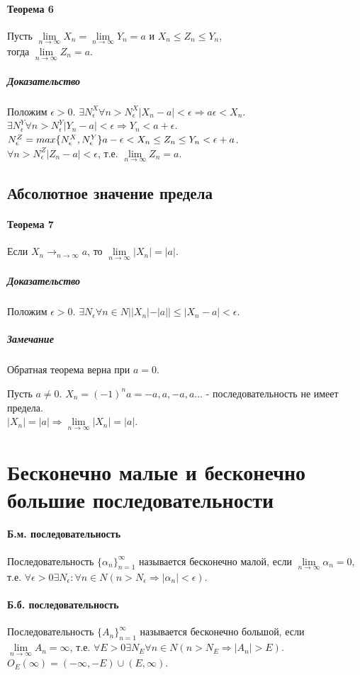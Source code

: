 \documentclass[10pt]{article}
\newcommand{\limninf}{\lim\limits_{n \to \infty}}
\newcommand{\seq}[2]{ \{#1_{#2}\}_{#2=1}^\infty}
\newcommand{\seqn}[1]{\seq{#1}{n}}
\begin{document}
			\paragraph{Теорема 6}
			Пусть $\lim\limits_{n \to \infty} X_n = \lim\limits_{n\to \infty} Y_n = a$ и $X_n \le Z_n \le Y_n$,\\
			тогда $\lim\limits_{n \to \infty} Z_n = a$.
			\subparagraph{Доказательство}
			Положим $\epsilon > 0$. $\exists N_\epsilon^X \forall n > N_\epsilon^X |X_n - a| < \epsilon \Rightarrow a\epsilon < X_n$.\\
			$\exists N_\epsilon^Y \forall n > N_\epsilon^Y |Y_n - a| < \epsilon \Rightarrow Y_n < a + \epsilon$.\\
			$N_\epsilon^Z = max \{N_\epsilon^X, N_\epsilon^Y\}\\ a - \epsilon < X_n \le Z_n \le Y_n < \epsilon + a$.\\
			$\forall n > N_\epsilon^Z |Z_n - a| < \epsilon$, т.е. $\lim\limits_{n\to \infty} Z_n = a$.
		\subsection{Абсолютное значение предела}
			\paragraph{Теорема 7}
			Если $X_n \to_{n\to \infty} a$, то $\lim\limits_{n\to \infty} |X_n| = |a|$.
			\subparagraph{Доказательство}
			Положим $\epsilon > 0$. $\exists N_\epsilon \forall n \in N ||X_n| - |a|| \le |X_n - a| < \epsilon$.
			\subparagraph{Замечание}
			Обратная теорема верна при $a = 0$.
			
			Пусть $a \neq 0$. $X_n = (-1)^na = -a, a, -a, a \dots$ - последовательность не имеет предела.\\
			$|X_n| = |a| \Rightarrow \lim\limits_{n\to \infty} |X_n| = |a|$.
	\section{Бесконечно малые и бесконечно большие последовательности}
		\paragraph{Б.м. последовательность}
		Последовательность $\seqn{\alpha}$ называется бесконечно малой, если $\limninf \alpha_n = 0$, т.е. $\forall \epsilon > 0 \exists N_\epsilon : \forall n \in N (n > N_\epsilon \Rightarrow |\alpha_n| < \epsilon)$.
		\paragraph{Б.б. последовательность}
		Последовательность $\seqn{A}$ называется бесконечно большой, если $\limninf A_n = \infty$, т.е. $\forall E > 0 \exists  N_E \forall n \in N (n > N_E \Rightarrow |A_n| > E)$. \\
		$O_E(\infty) = (-\infty, -E) \cup (E, \infty)$.
\end{document}
